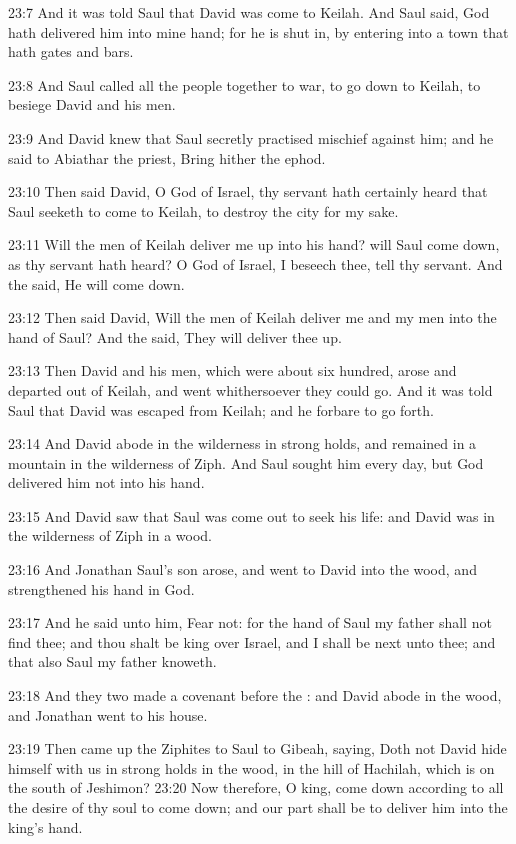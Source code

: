 23:7 And it was told Saul that David was come to Keilah. And Saul said, God hath delivered him into mine hand; for he is shut in, by entering into a town that hath gates and bars.

23:8 And Saul called all the people together to war, to go down to Keilah, to besiege David and his men.

23:9 And David knew that Saul secretly practised mischief against him; and he said to Abiathar the priest, Bring hither the ephod.

23:10 Then said David, O \LORD God of Israel, thy servant hath certainly heard that Saul seeketh to come to Keilah, to destroy the city for my sake.

23:11 Will the men of Keilah deliver me up into his hand? will Saul come down, as thy servant hath heard? O \LORD God of Israel, I beseech thee, tell thy servant. And the \LORD said, He will come down.

23:12 Then said David, Will the men of Keilah deliver me and my men into the hand of Saul? And the \LORD said, They will deliver thee up.

23:13 Then David and his men, which were about six hundred, arose and departed out of Keilah, and went whithersoever they could go. And it was told Saul that David was escaped from Keilah; and he forbare to go forth.

23:14 And David abode in the wilderness in strong holds, and remained in a mountain in the wilderness of Ziph. And Saul sought him every day, but God delivered him not into his hand.

23:15 And David saw that Saul was come out to seek his life: and David was in the wilderness of Ziph in a wood.

23:16 And Jonathan Saul's son arose, and went to David into the wood, and strengthened his hand in God.

23:17 And he said unto him, Fear not: for the hand of Saul my father shall not find thee; and thou shalt be king over Israel, and I shall be next unto thee; and that also Saul my father knoweth.

23:18 And they two made a covenant before the \LORD: and David abode in the wood, and Jonathan went to his house.

23:19 Then came up the Ziphites to Saul to Gibeah, saying, Doth not David hide himself with us in strong holds in the wood, in the hill of Hachilah, which is on the south of Jeshimon?  23:20 Now therefore, O king, come down according to all the desire of thy soul to come down; and our part shall be to deliver him into the king's hand.

